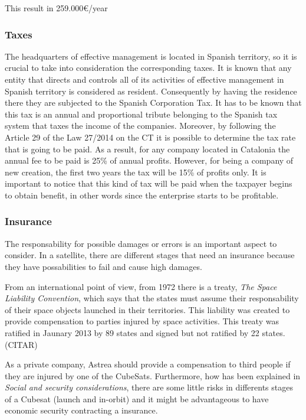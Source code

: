 This result in 259.000\euro/year
\subsubsection{Taxes}
The headquarters of effective management is located in Spanish territory, so it is crucial to take into consideration the corresponding taxes. It is known that any entity that directs and controls all of its activities of effective management in Spanish territory is considered as resident. Consequently by having the residence there they are subjected to the Spanish Corporation Tax. It has to be known that this tax is an annual and proportional tribute belonging to the Spanish tax system that taxes the income of the companies.
\newline
\newline
Moreover, by following the Article 29 of the Law 27/2014 on the CT it is possible to determine the tax rate that is going to be paid. As a result, for any company located in Catalonia the annual fee to be paid is 25\% of annual profits. However, for being a company of new creation, the first two years the tax will be 15\% of profits only. It is important to notice that this kind of tax will be paid when the taxpayer begins to obtain benefit, in other words since the enterprise starts to be profitable.   
\subsubsection{Insurance}

The responsability for possible damages or errors is an important aspect to consider. In a satellite, there are different stages that need an insurance because they have possabilities to fail and cause high damages.

From an international point of view, from 1972 there is a treaty, \textit{The Space Liability Convention}, which says that the states must assume their responsability of their space objects launched in their territories. This liability was created to provide compensation to parties injured by space activities. This treaty was ratified in Jaunary 2013 by 89 states and signed but not ratified by 22 states.   \cite{} (CITAR)

As a private company, Astrea should provide a compensation to third people if they are injured by one of the CubeSats. Furthermore,  how has been explained in \textit{Social and security considerations}, there are some little risks in differents stages of a Cubesat (launch and in-orbit) and it might be advantageous to have economic security contracting a insurance. 

